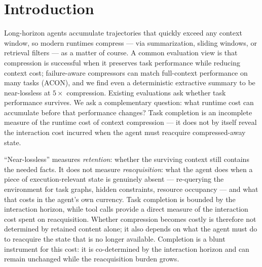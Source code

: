 \documentclass[11pt]{article}
\begin{document}
\begin{abstract}
Using retention interventions as causal probes, we separate \emph{how much} state is retained
from \emph{which} state is retained and \emph{whether the retained content is valid}. Random
selection matches an offline hindsight oracle, while replacing the retained D-state with
semantically irrelevant content increases retrieval by 57\% ($p < 0.001$) with completion
statistically unchanged --- completion-centric evaluation can fail to expose both the
magnitude and the behavioral consequence of a cost-changing intervention.

We do not claim compression has a fixed cost: in a second environment (ALFWorld) the same
operator produces no retrieval surge, so the reacquisition signature is
environment-dependent rather than an intrinsic consequence of shortening context. In our
controlled setting, the hidden interaction cost of compression emerges when
execution-relevant state becomes absent and must be reacquired; completion alone can miss
that cost, while the magnitude --- and even the presence --- of the cost depends on model,
task, state, and environment. We provide a tool-level diagnostic for a cost that
completion-centric evaluation does not expose.
\end{abstract}

\section{Introduction}
\label{sec:intro}

Long-horizon agents accumulate trajectories that quickly exceed any context window, so
modern runtimes compress --- via summarization, sliding windows, or retrieval filters --- as
a matter of course. A common evaluation view is that compression is successful when it
preserves task performance while reducing context cost; failure-aware compressors can
match full-context performance on many tasks (ACON), and we find even a deterministic
extractive summary to be near-lossless at $5\times$ compression. Existing evaluations ask
whether task performance survives. We ask a complementary question: what runtime cost can
accumulate before that performance changes? Task completion is an incomplete measure of
the runtime cost of context compression --- it does not by itself reveal the interaction
cost incurred when the agent must reacquire compressed-away state.

``Near-lossless'' measures \emph{retention}: whether the surviving context still contains the
needed facts. It does not measure \emph{reacquisition}: what the agent does when a piece of
execution-relevant state is genuinely absent --- re-querying the environment for task
graphs, hidden constraints, resource occupancy --- and what that costs in the agent's own
currency. Task completion is bounded by the interaction horizon, while tool calls
provide a direct measure of the interaction cost spent on reacquisition. Whether
compression becomes costly is therefore not determined by retained content alone;
it also depends on what the agent must do to reacquire the state that is no longer
available. Completion is a blunt instrument for this cost: it is co-determined by the
interaction horizon and can remain unchanged while the reacquisition burden grows.
\end{document}
